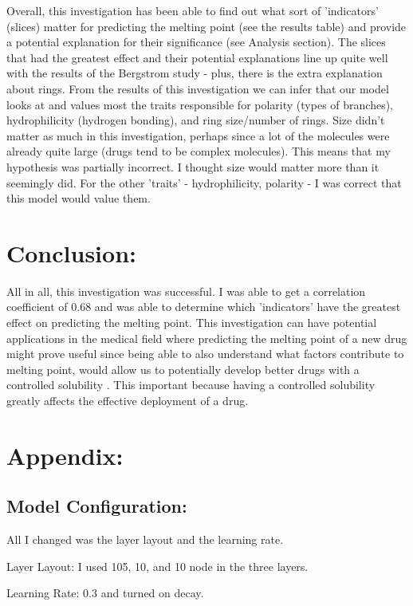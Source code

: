 \documentclass[11pt]{article}
\begin{document}
Overall, this investigation has been able to find out what sort of 'indicators' (slices) matter for predicting the melting point (see the results table) and provide a potential explanation for their significance (see Analysis section).
The slices that had the greatest effect and their potential explanations line up quite well with the results of the Bergstrom study - plus, there is the extra explanation about rings. From the results of this investigation 
we can infer that our model looks at and values most the traits responsible for polarity (types of branches), hydrophilicity (hydrogen bonding), and ring size/number of rings. Size didn't matter as much
in this investigation, perhaps since a lot of the molecules were already quite large (drugs tend to be complex molecules). This means that my hypothesis was partially incorrect. I thought size would matter more than it seemingly did.
For the other 'traits' - hydrophilicity, polarity - I was correct that this model would value them. 
\section{Conclusion:}
\label{sec:org569f1b0}
All in all, this investigation was successful. I was able to get a correlation coefficient of 0.68 and was
able to determine which 'indicators' have the greatest effect on predicting the melting point. This investigation can have potential
applications in the medical field where predicting the melting point of a new drug might prove useful since being 
able to also understand what factors contribute to melting point, would allow us to potentially develop better drugs with 
a controlled solubility \cite{bergstrom}. This important because having a controlled solubility greatly affects the effective
deployment of a drug. 



\section{Appendix:}
\label{sec:org2f06532}
\subsection{Model Configuration:}
\label{sec:org1b74de3}
All I changed was the layer layout and the learning rate.

Layer Layout: I used 105, 10, and 10 node in the three layers.

Learning Rate: 0.3 and turned on decay.
\end{document}
